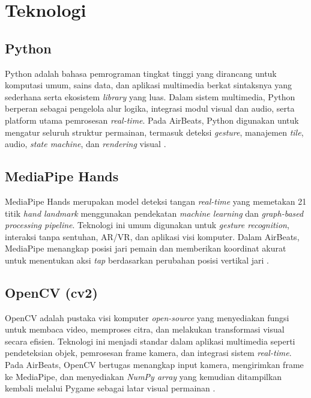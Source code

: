 \documentclass[12pt,a4paper]{article}
\begin{document}
\section{Teknologi}

\subsection{Python}

Python adalah bahasa pemrograman tingkat tinggi yang dirancang untuk komputasi umum, sains data, dan aplikasi multimedia berkat sintaksnya yang sederhana serta ekosistem \textit{library} yang luas. Dalam sistem multimedia, Python berperan sebagai pengelola alur logika, integrasi modul visual dan audio, serta platform utama pemrosesan \textit{real-time}. Pada AirBeats, Python digunakan untuk mengatur seluruh struktur permainan, termasuk deteksi \textit{gesture}, manajemen \textit{tile}, audio, \textit{state machine}, dan \textit{rendering} visual \cite{python}.

\subsection{MediaPipe Hands}

MediaPipe Hands merupakan model deteksi tangan \textit{real-time} yang memetakan 21 titik \textit{hand landmark} menggunakan pendekatan \textit{machine learning} dan \textit{graph-based processing pipeline}. Teknologi ini umum digunakan untuk \textit{gesture recognition}, interaksi tanpa sentuhan, AR/VR, dan aplikasi visi komputer. Dalam AirBeats, MediaPipe menangkap posisi jari pemain dan memberikan koordinat akurat untuk menentukan aksi \textit{tap} berdasarkan perubahan posisi vertikal jari \cite{mediapipe}.

\subsection{OpenCV (cv2)}

OpenCV adalah pustaka visi komputer \textit{open-source} yang menyediakan fungsi untuk membaca video, memproses citra, dan melakukan transformasi visual secara efisien. Teknologi ini menjadi standar dalam aplikasi multimedia seperti pendeteksian objek, pemrosesan frame kamera, dan integrasi sistem \textit{real-time}. Pada AirBeats, OpenCV bertugas menangkap input kamera, mengirimkan frame ke MediaPipe, dan menyediakan \textit{NumPy array} yang kemudian ditampilkan kembali melalui Pygame sebagai latar visual permainan \cite{opencv}.
\end{document}

